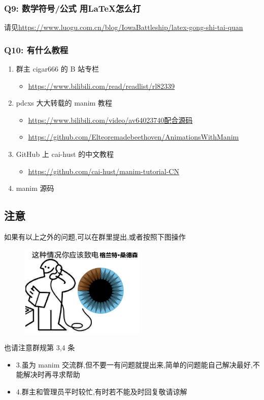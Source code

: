 \documentclass[a4paper]{article}
\begin{document}
\subsubsection*{Q9: 数学符号/公式 用\LaTeX 怎么打}
请见\url{https://www.luogu.com.cn/blog/IowaBattleship/latex-gong-shi-tai-quan}

\subsubsection*{Q10: 有什么教程}
\begin{enumerate}[1.]
    \item 群主 cigar666 的 B 站专栏
    \begin{itemize}
        \item \url{https://www.bilibili.com/read/readlist/rl82339}
    \end{itemize}
    \item pdcxs 大大转载的 manim 教程
    \begin{itemize}
        \item \url{https://www.bilibili.com/video/av64023740配合源码}
        \item \url{https://github.com/Elteoremadebeethoven/AnimationsWithManim}
    \end{itemize}
    \item GitHub 上 cai-hust 的中文教程
    \begin{itemize}
        \item \url{https://github.com/cai-hust/manim-tutorial-CN}
    \end{itemize}
    \item manim 源码
\end{enumerate}

\newpage

\begin{center}
    \section{注意}
\end{center}

如果有以上之外的问题,可以在群里提出,或者按照下图操作

    \begin{figure}[h]
        \begin{center}
            \includegraphics[width=6cm]{grant.png}
        \end{center}
    \end{figure}

也请注意群规第 3,4 条
\begin{itemize}
    \item 3.虽为 manim 交流群,但不要一有问题就提出来,简单的问题能自己解决最好,不能解决时再寻求帮助
    \item 4.群主和管理员平时较忙,有时若不能及时回复敬请谅解
\end{itemize}
\end{document}

